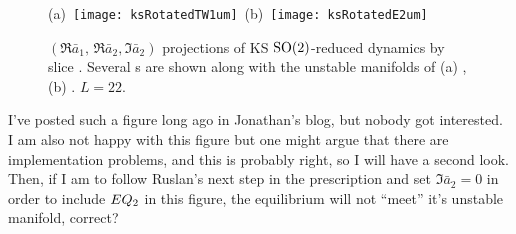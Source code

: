 \begin{figure}
 (a)~\texttt{[image: ksRotatedTW1um]}\,
 (b)~\texttt{[image: ksRotatedE2um]}
\caption{
 $(\Re \bar{a}_1,\,\Re \bar{a}_2,\Im \bar{a}_2)$ projections of KS
 $\textrm{SO}(2)$-reduced dynamics by slice .
 Several \rpo s are shown along with the
 unstable manifolds of (a) , (b) . $L=22$.
}
\end{figure}

I've posted such a figure long ago in Jonathan's blog, but
nobody got interested. I am also not happy with this figure
but one might argue that there are implementation problems,
and this is probably right, so I will have a second look.
Then, if I am to follow Ruslan's next step in the
prescription and set $\Im \bar{a}_2 =0$ in order to include
$EQ_{2}$ in this figure, the equilibrium will not ``meet''
it's unstable manifold, correct?

